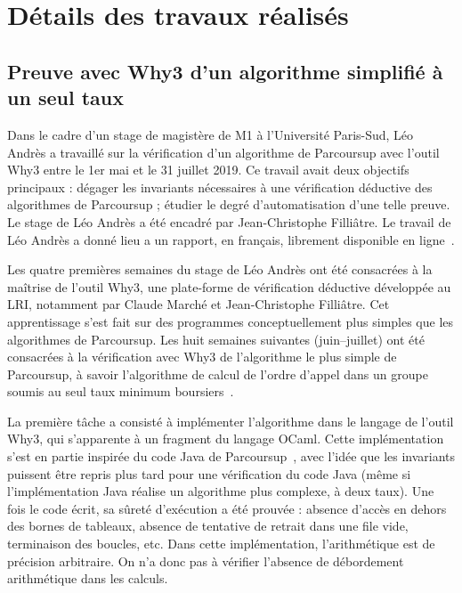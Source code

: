 \documentclass[a4paper]{report}
\begin{document}
\chapter{Détails des travaux réalisés}

\section{Preuve avec Why3 d'un algorithme simplifié à un seul taux}
\label{sec:untaux}

Dans le cadre d'un stage de magistère de M1 à l'Université Paris-Sud,
Léo Andrès a travaillé sur la vérification d'un algorithme de
Parcoursup avec l'outil Why3 entre le 1er mai et le 31 juillet 2019.
Ce travail avait deux objectifs principaux : dégager les invariants
nécessaires à une vérification déductive des algorithmes de
Parcoursup ; étudier le degré d'automatisation d'une telle preuve.
Le stage de Léo Andrès a été encadré par Jean-Christophe Filliâtre.
Le travail de Léo Andrès a donné lieu a un rapport, en français,
librement disponible en ligne~\cite{andres19rr}.

Les quatre premières semaines du stage de Léo Andrès ont été
consacrées à la maîtrise de l'outil Why3, une plate-forme de
vérification déductive développée au LRI, notamment par Claude Marché
et Jean-Christophe Filliâtre. Cet apprentissage s'est fait sur des
programmes conceptuellement plus simples que les algorithmes de
Parcoursup.  Les huit semaines suivantes (juin--juillet) ont été
consacrées à la vérification avec Why3 de l'algorithme le plus simple
de Parcoursup, à savoir l'algorithme de calcul de l’ordre d’appel dans
un groupe soumis au seul taux minimum boursiers~\cite[page
7]{parcoursup-specifications}.

La première tâche a consisté à implémenter l'algorithme dans le langage de
l'outil Why3, qui s'apparente à un fragment du langage OCaml. Cette
implémentation s'est en partie inspirée du code Java de
Parcoursup~\cite{parcoursup-source}, avec l'idée que les invariants puissent
être repris plus tard pour une vérification du code Java (même si
l'implémentation Java réalise un algorithme plus complexe, à deux taux). Une
fois le code écrit, sa sûreté d'exécution a été prouvée : absence d'accès en
dehors des bornes de tableaux, absence de tentative de retrait dans une file
vide, terminaison des boucles, etc.
Dans cette implémentation, l'arithmétique est de précision arbitraire. On n'a
donc pas à vérifier l'absence de débordement arithmétique dans les calculs.
\end{document}
